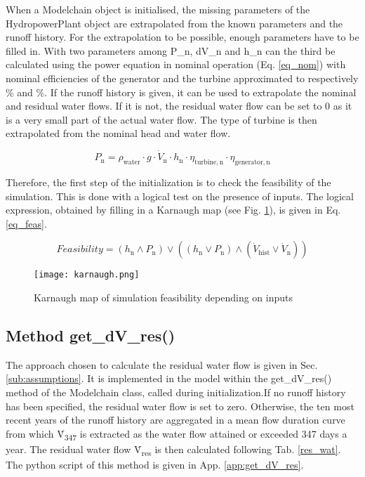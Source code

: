 When a Modelchain object is initialised, the missing parameters of the HydropowerPlant object are extrapolated from the known parameters and the runoff history. For the extrapolation to be possible, enough parameters have to be filled in. With two parameters among  P{\_}n, dV{\_}n and h{\_}n can the third be calculated using the power equation in nominal operation (Eq. \eqref{eq_nom}) with nominal efficiencies of the generator and the turbine approximated to respectively \unit[95]{\%} and \unit[90]{\%}. If the runoff history is given, it can be used to extrapolate the nominal and residual water flows. If it is not, the residual water flow can be set to 0 as it is a very small part of the actual water flow. The type of turbine is then extrapolated from the nominal head and water flow.

\begin{equation}
\label{eq_nom} 
 P_\mathrm{n} = \rho_\mathrm{water} \cdot g \cdot \dot{V}_\mathrm{n} \cdot h_\mathrm{n} \cdot \eta_\mathrm{turbine, n} \cdot \eta_\mathrm{generator, n}
\end{equation}

Therefore, the first step of the initialization is to check the feasibility of the simulation. This is done with a logical test on the presence of inputs. The logical expression, obtained by filling in a Karnaugh map (see Fig. \ref{karnaugh}), is given in Eq. \eqref{eq_feas}.

\begin{equation}
\label{eq_feas} 
 Feasibility = (h_\mathrm{n} \land P_\mathrm{n}) \lor ((h_\mathrm{n} \lor P_\mathrm{n}) \land (\dot{V}_\mathrm{hist} \lor \dot{V}_\mathrm{n}))
\end{equation}

\begin{figure}[H]
\centering
\texttt{[image: karnaugh.png]}
\caption{Karnaugh map of simulation feasibility depending on inputs}
\label{karnaugh}
\end{figure}

\subsection{Method get{\_}dV{\_}res()}
\label{sub:getdVres}
The approach chosen to calculate the residual water flow is given in Sec. \ref{sub:assumptions}. It is implemented in the model within the get{\_}dV{\_}res() method of the Modelchain class, called during initialization.\newline If no runoff history has been specified, the residual water flow is set to zero. Otherwise, the ten most recent years of the runoff history are aggregated in a mean flow duration curve from which \.{V}\textsubscript{347} is extracted as the water flow attained or exceeded 347 days a year. The residual water flow \.{V}\textsubscript{res} is then calculated following Tab. \ref{res_wat}. The python script of this method is given in App. \ref{app:get_dV_res}.

